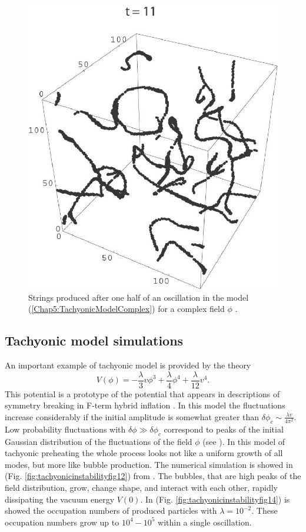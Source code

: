 \documentclass[11pt,a4paper,twoside]{book}
\begin{document}
\begin{figure}
	\centering
	\includegraphics[width=0.6\linewidth, height=0.35\textheight]{Images/Chap5/TachyonicInstability_Fig9}
	\caption{Strings produced after one half of an oscillation in the model (\ref{Chap5:TachyonicModelComplex}) for a complex field $\phi$ \cite{Chap5:TachyonicInstability}.}
	\label{fig:tachyonicinstabilityfig9}
\end{figure}
\subsection{Tachyonic model simulations}
An important example of tachyonic model is provided by the theory
\begin{equation}
	\label{Chap5:TachyonicModel1}
V(\phi)=-\frac{\lambda}{3}v\phi^{3} + \frac{\lambda}{4}\phi^{4} + \frac{\lambda}{12}v^{4}.
\end{equation}
This potential is a prototype of the potential that appears in descriptions of symmetry breaking in F-term hybrid inflation \cite{Chap5:FTerm}. In this model the fluctuations increase considerably if the initial amplitude is somewhat greater than $ \delta \phi_{c} \sim \frac{\lambda v}{4\pi^{2}} $. Low probability fluctuations with $ \delta \phi \gg \delta \phi_{c} $ correspond to peaks of the initial Gaussian distribution of the fluctuations  of the field $\phi$ (see \cite{Chap5:TachyonicInstability}). In this model of tachyonic preheating the whole process looks not like a uniform growth of all modes, but more like bubble  production. The numerical simulation is showed in (Fig. \ref{fig:tachyonicinstabilityfig12}) from \cite{Chap5:TachyonicInstability}. The bubbles, that are high peaks of the field distribution, grow, change shape, and interact with each other, rapidly dissipating the vacuum energy $ V(0) $. In (Fig. \ref{fig:tachyonicinstabilityfig14}) is showed the occupation numbers of produced particles with $ \lambda=10^{-2} $. These occupation numbers grow up to $ 10^{4}-10^{5} $ within a single oscillation.
\end{document}
